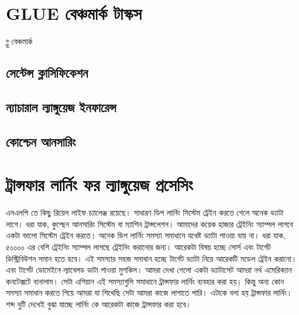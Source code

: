 \documentclass{article}[book]
\begin{document}
\section{GLUE বেঞ্চমার্ক টাস্কস}
গ্লু বেঞ্চমার্ক \cite{wang-etal-2018-glue}

\subsection{সেন্টেন্স ক্লাসিফিকেশন}
\subsection{ন্যাচারাল ল্যাঙ্গুয়েজ  ইনফারেন্স}
\subsection{কোশ্চেন আনসারিং}


\section{ট্রান্সফার লার্নিং ফর ল্যাঙ্গুয়েজ প্রসেসিং}
এনএলপি তে কিছু রিয়েল লাইফ চ্যালেঞ্জ রয়েছে। সাধারণ ডিপ লার্নিং সিস্টেম ট্রেইন করতে গেলে অনেক ড্যাটা লাগে। ধরা যাক, কুশ্ছেন আনসারিং সিস্টেম বা ম্যাশিন ট্রান্সলেশন। আমাদের কয়েক হাজার ট্রেইনিং স্যাম্পল লাগবে একটা ভালো সিস্টেম ট্রেইন করতে।  অনেক ডিপ লার্নিং সমস্যা সমাধানে যথেষ্ট ড্যাটা পাওয়া যায় না। ধরা যাক, ৫০০০০ এর বেশি ট্রেইনিং স্যাম্পল লাগছে ট্রেইনিং করানোর জন্য। আরেকটা বিষয় হচ্ছে সোর্স এবং টার্গেট ডিস্ট্রিবিউশন সমান হতে হবে। এই সমস্যার সহজ সমাধান হচ্ছে টার্গেট ড্যাটা নিয়ে আরেকটি মডেল ট্রেইন করানো। এবং টার্গেট ডোমেইনে ল্যাবেলড ডাটা পাওয়া মুশকিল। আমরা দেখা গেলো একটা ড্যাটাসেট আমরা নর্থ এমেরিক্যান কনটেক্সটে বানালাম। সেটা এশিয়ান এই সমস্যাগুলি সমাধানে ট্রান্সফার লার্নিং ব্যবহার করা হয়। কিন্তু অন্য কোন সমস্যা সমাধান করতে গিয়ে আমরা যা শিখেছি সেটা আমরা কাজে লাগাতে পারি। এটাকে বলা হয় ট্রান্সফার লার্নিং। শব্দ দুটি দেখেই বুঝা যাচ্ছে লার্নিং কে আরেকটা কাজে ট্রান্সফার করা হবে। 
\end{document}
